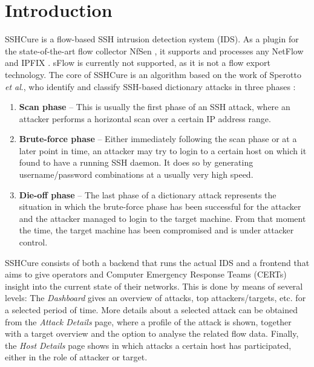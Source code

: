 \section{Introduction}
\label{sec:introduction}

SSHCure is a flow-based SSH intrusion detection system (IDS). As a plugin for the state-of-the-art flow collector NfSen \cite{nfsen}, it supports and processes any NetFlow \cite{rfc3954} and IPFIX \cite{rfc5470}. sFlow \cite{sflowv5} is currently not supported, as it is not a flow export technology. The core of SSHCure is an algorithm based on the work of Sperotto \textit{et al}., who identify and classify SSH-based dictionary attacks in three phases \cite{sperotto2009}:

\begin{enumerate}
	\item \textbf{Scan phase} -- This is usually the first phase of an SSH attack, where an attacker performs a horizontal scan over a certain IP address range.
	
	\item \textbf{Brute-force phase} -- Either immediately following the scan phase or at a later point in time, an attacker may try to login to a certain host on which it found to have a running SSH daemon. It does so by generating username/password combinations at a usually very high speed.
	
	\item \textbf{Die-off phase} -- The last phase of a dictionary attack represents the situation in which the brute-force phase has been successful for the attacker and the attacker managed to login to the target machine. From that moment the time, the target machine has been compromised and is under attacker control.
\end{enumerate}

SSHCure consists of both a backend that runs the actual IDS and a frontend that aims to give operators and Computer Emergency Response Teams (CERTs) insight into the current state of their networks. This is done by means of several levels: The \textit{Dashboard} gives an overview of attacks, top attackers/targets, etc. for a selected period of time. More details about a selected attack can be obtained from the \textit{Attack Details} page, where a profile of the attack is shown, together with a target overview and the option to analyse the related flow data. Finally, the \textit{Host Details} page shows in which attacks a certain host has participated, either in the role of attacker or target.


